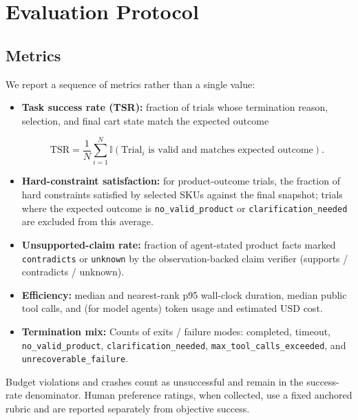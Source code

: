 \documentclass{article} %
\begin{document}
% 
\section{Evaluation Protocol}
\label{sec:eval_protocol}

\subsection{Metrics}

We report a sequence of metrics rather than a single value:

\begin{itemize}[leftmargin=*,noitemsep,topsep=0pt]
    \item \textbf{Task success rate (TSR):} fraction of trials whose termination reason, selection, and final cart state match the expected outcome

    \begin{equation}
    \text{TSR} = \frac{1}{N} \sum_{i=1}^N \mathbb{I}(\text{Trial}_i \text{ is valid and matches expected outcome}).
    \end{equation}
    
    
    \item \textbf{Hard-constraint satisfaction:} for product-outcome trials, the fraction of hard constraints satisfied by selected SKUs against the final snapshot; trials where the expected outcome is \texttt{no\_valid\_product} or \texttt{clarification\_needed} are excluded from this average.
    \item \textbf{Unsupported-claim rate:} fraction of agent-stated product facts marked \texttt{contradicts} or \texttt{unknown} by the observation-backed claim verifier (supports / contradicts / unknown).
    \item \textbf{Efficiency:} median and nearest-rank p95 wall-clock duration, median public tool calls, and (for model agents) token usage and estimated USD cost.
    \item \textbf{Termination mix:} Counts of exits / failure modes: completed, timeout,\\ \texttt{no\_valid\_product}, \texttt{clarification\_needed}, \texttt{max\_tool\_calls\_exceeded}, and \texttt{unrecoverable\_failure}.
\end{itemize}

Budget violations and crashes count as unsuccessful and remain in the success-rate denominator. Human preference ratings, when collected, use a fixed anchored rubric and are reported separately from objective success.
\end{document}
